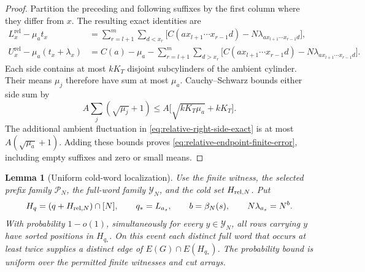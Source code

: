 \documentclass[11pt]{article}
\numberwithin{equation}{section}
\newtheorem{lemma}[lemma]{Lemma}
\newcommand{\1}{\mathbf 1}
\begin{document}
\begin{proof}
Partition the preceding and following suffixes by the first column
where they differ from \(x\).  The resulting exact identities are
\begin{align}
\label{eq:relative-left-side-exact}
 L_x^{\mathrm{rel}}-\mu_at_x
 &=\sum_{r=l+1}^m\sum_{d<x_r}
   \bigl[C(ax_{l+1}\cdots x_{r-1}d)
          -N\lambda_{ax_{l+1}\cdots x_{r-1}d}\bigr],\\
\label{eq:relative-right-side-exact}
 U_x^{\mathrm{rel}}-\mu_a(t_x+\lambda_x)
 &=C(a)-\mu_a
  -\sum_{r=l+1}^m\sum_{d>x_r}
   \bigl[C(ax_{l+1}\cdots x_{r-1}d)
          -N\lambda_{ax_{l+1}\cdots x_{r-1}d}\bigr].
\end{align}
Each side contains at most \(kK_T\) disjoint subcylinders of the
ambient cylinder.  Their means \(\mu_j\) therefore have sum at
most \(\mu_a\).  Cauchy--Schwarz bounds either side sum by
\[
 A\sum_j(\sqrt{\mu_j}+1)
 \le A\bigl[\sqrt{kK_T\mu_a}+kK_T\bigr].
\]
The additional ambient fluctuation in
\eqref{eq:relative-right-side-exact} is at most
\(A(\sqrt{\mu_a}+1)\).  Adding these bounds proves
\eqref{eq:relative-endpoint-finite-error}, including empty suffixes
and zero or small means.
\end{proof}

\begin{lemma}[Uniform cold-word localization]
\label{lem:localization}
Use the finite witness, the selected prefix family \(\mathcal P_N\),
the full-word family \(\mathcal Y_N\), and the cold set
\(H_{{\rm rel},N}\).  Put
\[
 H_q=(q+H_{{\rm rel},N})\cap[N],\qquad q_*=L_{a_s},\qquad
 b=\beta_N(s),\qquad N\lambda_{a_s}=N^b.
\]
With probability \(1-o(1)\), simultaneously for every
\(y\in\mathcal Y_N\), all rows carrying \(y\) have sorted
positions in \(H_{q_*}\).  On this event each distinct full word
that occurs at least twice supplies a distinct edge of
\(E(G)\cap E(H_{q_*})\).  The probability bound is uniform over
the permitted finite witnesses and cut arrays.
\end{lemma}
\end{document}
